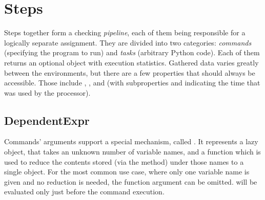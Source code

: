 \section{Steps}\label{sec:steps}

    Steps together form a checking \textit{pipeline}, each of them being responsible for a logically separate assignment.
    They are divided into two categories: \textit{commands} (specifying the program to run) and \textit{tasks}
    (arbitrary Python code).
     \label{sec:ExecutionStatistics} Each of them returns an optional object with execution statistics.
    Gathered data varies greatly between the environments, but there are a few properties that should always be
    accessible.
    Those include , , and 
    (with subproperties  and  indicating the time that was used by the processor).




\subsection{DependentExpr} \label{sec:DependentExpr}
    Commands' arguments support a special mechanism, called .
    It represents a lazy object, that takes an unknown number of variable names, and a function which is used to
    reduce the contents stored (via the \hyperref[sec:set_variable]{} method)
    under those names to a single object.
    For the most common use case, where only one variable name is given and no reduction is needed, the function
    argument can be omitted.
     will be evaluated only just before the command execution.

